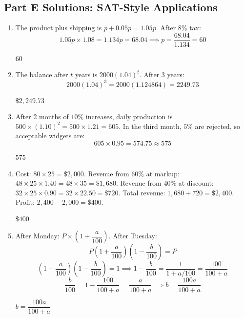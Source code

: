 \documentclass[14pt]{extarticle}
\begin{document}
\subsection*{Part E Solutions: SAT-Style Applications}
\begin{enumerate}
  \item The product plus shipping is \(p + 0.05p = 1.05p\). After \(8\%\) tax:
  \[
  1.05p \times 1.08 = 1.134p = 68.04 \implies p = \frac{68.04}{1.134} = 60
  \]

  \(\boxed{60}\)

  \item The balance after \(t\) years is \(2000(1.04)^t\). After 3 years:
  \[
  2000(1.04)^3 = 2000(1.124864) = 2249.73
  \]

  \(\boxed{\$2{,}249.73}\)

  \item After 2 months of \(10\%\) increases, daily production is \(500 \times (1.10)^2 = 500 \times 1.21 = 605\). In the third month, \(5\%\) are rejected, so acceptable widgets are:
  \[
  605 \times 0.95 = 574.75 \approx 575
  \]

  \(\boxed{575}\)

  \item Cost: \(80 \times 25 = \$2{,}000\). Revenue from \(60\%\) at markup: \(48 \times 25 \times 1.40 = 48 \times 35 = \$1{,}680\). Revenue from \(40\%\) at discount: \(32 \times 25 \times 0.90 = 32 \times 22.50 = \$720\). Total revenue: \(1{,}680 + 720 = \$2{,}400\). Profit: \(2{,}400 - 2{,}000 = \$400\).

  \(\boxed{\$400}\)

  \item After Monday: \(P \times \left(1 + \dfrac{a}{100}\right)\). After Tuesday:
  \[
  P\left(1 + \frac{a}{100}\right)\left(1 - \frac{b}{100}\right) = P
  \]
  \[
  \left(1 + \frac{a}{100}\right)\left(1 - \frac{b}{100}\right) = 1 \implies 1 - \frac{b}{100} = \frac{1}{1 + a/100} = \frac{100}{100 + a}
  \]
  \[
  \frac{b}{100} = 1 - \frac{100}{100 + a} = \frac{a}{100 + a} \implies b = \frac{100a}{100 + a}
  \]

  \(\boxed{b = \dfrac{100a}{100 + a}}\)
\end{enumerate}

\end{document}

